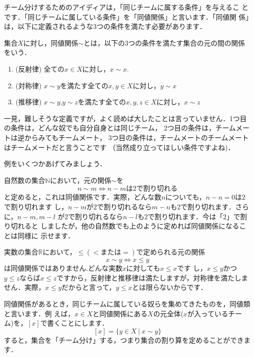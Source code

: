 チーム分けするためのアイディアは，「同じチームに属する条件」を与えるこ
とです．「同じチームに属している条件」を「同値関係」と言います．「同値関
係」は，以下に定義されるような3つの条件を満たす必要があります．

\begin{defi}[同値関係]
 集合$X$に対し，同値関係$\sim$とは，以下の3つの条件を満たす集合の元の間の関係をいう．
 \begin{enumerate}
  \item(反射律) 全ての$x\in X$に対し，$x \sim x.$
  \item(対称律)  $x\sim y$を満たす全ての$x,y\in X$に対し，$y\sim x$
  \item(推移律) $x\sim y$,$y\sim z$を満たす全ての$x,y,z\in X$に対し，$x\sim
	z$
 \end{enumerate}
\end{defi}
一見，難しそうな定義ですが，よく読めば大したことは言っていません．1つ目の条件は，どんな奴でも自分自身とは同じチーム，
2つ目の条件は，チームメートは逆からみてもチームメート，
3つ目の条件は，チームメートのチームメートはチームメートだと言うことです
（当然成り立ってほしい条件ですよね)．


例をいくつかあげてみましょう．
\begin{Ex}
 自然数の集合$\mathbb{N}$において，元の関係$\sim$を
 \[
  n\sim m\Leftrightarrow n-mは2で割り切れる
 \]
 と定めると，これは同値関係です．実際，どんな数$n$についても，$n-n=0$は$2$で割り切れます
 し，$n-m$が$2$で割り切れるなら$m-n$も2で割り切れます．さらに，$n-m,m-l$
 が$2$で割り切れるなら$n-l$も2で割り切れます．今は「$2$」で割り切れると
 しましたが，他の自然数でも上のように定めれば同値関係になることは同様に
 示せます．
\end{Ex}


\begin{Ex}
 実数の集合$\mathbb{R}$において，$\leq(<または=)$で定められる元の関係
 \[
  x\sim y\Leftrightarrow x\leq y
 \]
 は同値関係ではありません.どんな実数$x$に対しても$x\leq x$です
 し，$x\leq y$かつ$y \leq z$ならば$x\leq z$ですから，反射律と推移律は満たしますが，対称律を満たしま
 せん．実際，$x\leq y$だからと言って，$y\leq x$とは限らないからです．
\end{Ex}

同値関係があるとき，同じチームに属している奴らを集めてきたものを，同値類と言います．例
えば，$x\in X$と同値関係にある$X$の元全体($x$が入っているチーム)を，$[x]$で書くことにします．
\[
 [x]=\{y\in X\ |\ x\sim y\}
\]
すると，集合を「チーム分け」する，つまり集合の割り算を定めることができま
す．

